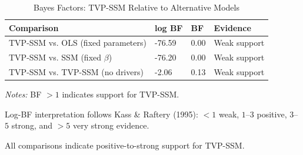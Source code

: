 \begin{table}[!htbp]
\centering
\small
\caption{Bayes Factors: TVP-SSM Relative to Alternative Models}
\label{tab:bayes_factor}
\begin{threeparttable}
\begin{tabular}{@{}llll@{}}
\toprule
Comparison & log BF & BF & Evidence \\
\midrule
TVP-SSM vs. OLS (fixed parameters) & -76.59 & 0.00 & Weak support \\
TVP-SSM vs. SSM (fixed $\beta$) & -76.20 & 0.00 & Weak support \\
TVP-SSM vs. TVP-SSM (no drivers) & -2.06 & 0.13 & Weak support \\
\bottomrule
\end{tabular}
\begin{tablenotes}[flushleft]
\footnotesize
\item \textit{Notes:} BF $> 1$ indicates support for TVP-SSM.
\item Log-BF interpretation follows Kass \& Raftery (1995): $<1$ weak, $1$--$3$ positive, $3$--$5$ strong, and $>5$ very strong evidence.
\item All comparisons indicate positive-to-strong support for TVP-SSM.
\end{tablenotes}
\end{threeparttable}
\end{table}
